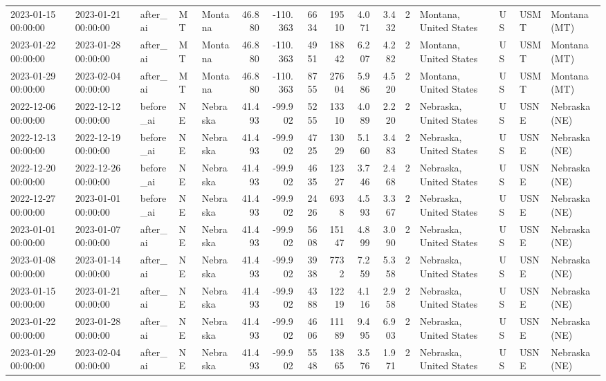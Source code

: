 \begin{tabular}{lllllrrrrrrlllll}
2023-01-15 00:00:00 & 2023-01-21 00:00:00 & after\_ai & MT & Montana & 46.880 & -110.363 & 6634 & 19510 & 4.071 & 3.432 & 2 & Montana, United States & US & USMT & Montana (MT) \\
2023-01-22 00:00:00 & 2023-01-28 00:00:00 & after\_ai & MT & Montana & 46.880 & -110.363 & 4951 & 18842 & 6.207 & 4.282 & 2 & Montana, United States & US & USMT & Montana (MT) \\
2023-01-29 00:00:00 & 2023-02-04 00:00:00 & after\_ai & MT & Montana & 46.880 & -110.363 & 8755 & 27604 & 5.986 & 4.520 & 2 & Montana, United States & US & USMT & Montana (MT) \\
2022-12-06 00:00:00 & 2022-12-12 00:00:00 & before\_ai & NE & Nebraska & 41.493 & -99.902 & 5255 & 13310 & 4.089 & 2.220 & 2 & Nebraska, United States & US & USNE & Nebraska (NE) \\
2022-12-13 00:00:00 & 2022-12-19 00:00:00 & before\_ai & NE & Nebraska & 41.493 & -99.902 & 4725 & 13029 & 5.160 & 3.483 & 2 & Nebraska, United States & US & USNE & Nebraska (NE) \\
2022-12-20 00:00:00 & 2022-12-26 00:00:00 & before\_ai & NE & Nebraska & 41.493 & -99.902 & 4635 & 12327 & 3.746 & 2.468 & 2 & Nebraska, United States & US & USNE & Nebraska (NE) \\
2022-12-27 00:00:00 & 2023-01-01 00:00:00 & before\_ai & NE & Nebraska & 41.493 & -99.902 & 2426 & 6938 & 4.593 & 3.367 & 2 & Nebraska, United States & US & USNE & Nebraska (NE) \\
2023-01-01 00:00:00 & 2023-01-07 00:00:00 & after\_ai & NE & Nebraska & 41.493 & -99.902 & 5608 & 15147 & 4.899 & 3.090 & 2 & Nebraska, United States & US & USNE & Nebraska (NE) \\
2023-01-08 00:00:00 & 2023-01-14 00:00:00 & after\_ai & NE & Nebraska & 41.493 & -99.902 & 3938 & 7732 & 7.259 & 5.358 & 2 & Nebraska, United States & US & USNE & Nebraska (NE) \\
2023-01-15 00:00:00 & 2023-01-21 00:00:00 & after\_ai & NE & Nebraska & 41.493 & -99.902 & 4388 & 12219 & 4.116 & 2.958 & 2 & Nebraska, United States & US & USNE & Nebraska (NE) \\
2023-01-22 00:00:00 & 2023-01-28 00:00:00 & after\_ai & NE & Nebraska & 41.493 & -99.902 & 4606 & 11189 & 9.495 & 6.903 & 2 & Nebraska, United States & US & USNE & Nebraska (NE) \\
2023-01-29 00:00:00 & 2023-02-04 00:00:00 & after\_ai & NE & Nebraska & 41.493 & -99.902 & 5548 & 13865 & 3.576 & 1.971 & 2 & Nebraska, United States & US & USNE & Nebraska (NE) \\

\end{tabular}
